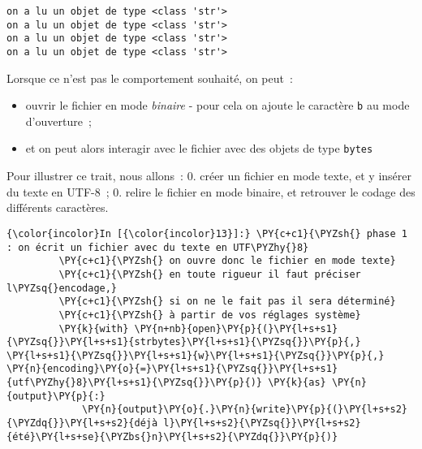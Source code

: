     \begin{Verbatim}[commandchars=\\\{\}]
on a lu un objet de type <class 'str'>
on a lu un objet de type <class 'str'>
on a lu un objet de type <class 'str'>
on a lu un objet de type <class 'str'>

    \end{Verbatim}

    Lorsque ce n'est pas le comportement souhaité, on peut~:

\begin{itemize}
\tightlist
\item
  ouvrir le fichier en mode \emph{binaire} - pour cela on ajoute le
  caractère \texttt{b} au mode d'ouverture~;
\item
  et on peut alors interagir avec le fichier avec des objets de type
  \texttt{bytes}
\end{itemize}

    Pour illustrer ce trait, nous allons~: 0. créer un fichier en mode
texte, et y insérer du texte en UTF-8~; 0. relire le fichier en mode
binaire, et retrouver le codage des différents caractères.

    \begin{Verbatim}[commandchars=\\\{\}]
{\color{incolor}In [{\color{incolor}13}]:} \PY{c+c1}{\PYZsh{} phase 1 : on écrit un fichier avec du texte en UTF\PYZhy{}8}
         \PY{c+c1}{\PYZsh{} on ouvre donc le fichier en mode texte}
         \PY{c+c1}{\PYZsh{} en toute rigueur il faut préciser l\PYZsq{}encodage,}
         \PY{c+c1}{\PYZsh{} si on ne le fait pas il sera déterminé}
         \PY{c+c1}{\PYZsh{} à partir de vos réglages système}
         \PY{k}{with} \PY{n+nb}{open}\PY{p}{(}\PY{l+s+s1}{\PYZsq{}}\PY{l+s+s1}{strbytes}\PY{l+s+s1}{\PYZsq{}}\PY{p}{,} \PY{l+s+s1}{\PYZsq{}}\PY{l+s+s1}{w}\PY{l+s+s1}{\PYZsq{}}\PY{p}{,} \PY{n}{encoding}\PY{o}{=}\PY{l+s+s1}{\PYZsq{}}\PY{l+s+s1}{utf\PYZhy{}8}\PY{l+s+s1}{\PYZsq{}}\PY{p}{)} \PY{k}{as} \PY{n}{output}\PY{p}{:}
             \PY{n}{output}\PY{o}{.}\PY{n}{write}\PY{p}{(}\PY{l+s+s2}{\PYZdq{}}\PY{l+s+s2}{déjà l}\PY{l+s+s2}{\PYZsq{}}\PY{l+s+s2}{été}\PY{l+s+se}{\PYZbs{}n}\PY{l+s+s2}{\PYZdq{}}\PY{p}{)}
\end{Verbatim}


